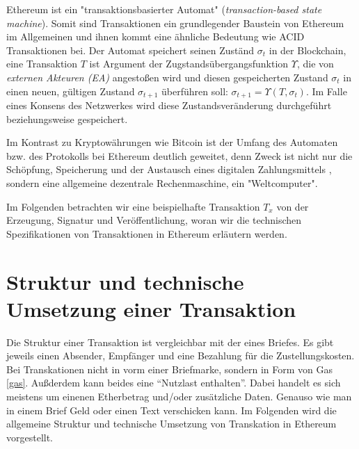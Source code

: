 \documentclass[runningheads]{llncs}
\begin{document}
Ethereum ist ein "transaktionsbasierter Automat" (\textit{transaction-based state machine}). Somit sind Transaktionen ein grundlegender Baustein von Ethereum im Allgemeinen und ihnen kommt eine ähnliche Bedeutung wie ACID Transaktionen bei. Der Automat speichert seinen Zuständ $ \sigma_t $ in der Blockchain, eine Transaktion $ T $ ist Argument der Zugstandsübergangsfunktion $ \Upsilon $, die von \textit{externen Akteuren (EA)} angestoßen wird und diesen gespeicherten Zustand $ \sigma_t $ in einen neuen, gültigen Zustand $ \sigma_{t + 1} $ überführen soll: $\sigma_{t+1} = \Upsilon(T, \sigma_t) $. Im Falle eines Konsens des Netzwerkes wird diese Zustandsveränderung durchgeführt beziehungsweise gespeichert.

Im Kontrast zu Kryptowährungen wie Bitcoin ist der Umfang des Automaten bzw. des Protokolls bei Ethereum deutlich geweitet, denn Zweck ist nicht nur die Schöpfung, Speicherung und der Austausch eines digitalen Zahlungsmittels \cite{nakamoto_bitcoin_nodate}, sondern eine allgemeine dezentrale Rechenmaschine, ein "Weltcomputer".  \cite[S. 1-4]{wood_ethereum/yellowpaper_2019}

Im Folgenden betrachten wir eine beispielhafte Transaktion $ T_x $ von der Erzeugung, Signatur und Veröffentlichung, woran wir die technischen Spezifikationen von Transaktionen in Ethereum erläutern werden.

\section{Struktur und technische Umsetzung einer Transaktion}
Die Struktur einer Transaktion ist vergleichbar mit der eines Briefes. Es gibt jeweils einen Absender, Empfänger und eine Bezahlung für die Zustellungskosten. Bei Transkationen nicht in vorm einer Briefmarke, sondern in Form von Gas \ref{gas}. Außderdem kann beides eine "`Nutzlast enthalten"'. Dabei handelt es sich meistens um einenen Etherbetrag und/oder zusätzliche Daten. Genauso wie man in einem Brief Geld oder einen Text verschicken kann. Im Folgenden wird die allgemeine Struktur und technische Umsetzung von Transkation in Ethereum vorgestellt.
\end{document}
